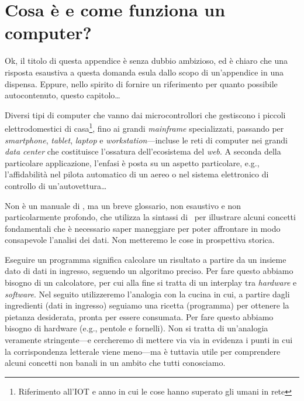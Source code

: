 



\chapter{Cosa \`e e come funziona un computer?}
\label{sec:computazione}

Ok, il titolo di questa appendice \`e senza dubbio ambizioso, ed \`e chiaro che
una risposta esaustiva a questa domanda esula dallo scopo di un'appendice in una
dispensa. Eppure, nello spirito di fornire un riferimento per quanto possibile
autocontenuto, questo capitolo\ldots

Diversi tipi di computer che vanno dai microcontrollori che gestiscono i piccoli
elettrodomestici di casa\footnote{Riferimento all'IOT e anno in cui le cose hanno
superato gli umani in rete}, fino ai grandi \emph{mainframe} specializzati,
passando per \emph{smartphone}, \emph{tablet}, \emph{laptop} e
\emph{workstation}---incluse le reti di computer nei grandi \emph{data center}
che costituisce l'ossatura dell'ecosistema del \emph{web}. A seconda della
particolare applicazione, l'enfasi \`e posta su un aspetto particolare, e.g.,
l'affidabilit\`a nel pilota automatico di un aereo o nel sistema elettronico di
controllo di un'autovettura\ldots

Non \`e un manuale di \python, ma un breve glossario, non esaustivo e non particolarmente
profondo, che utilizza la sintassi di \python\ per illustrare alcuni concetti fondamentali
che \`e necessario saper maneggiare per poter affrontare in modo consapevole
l'analisi dei dati. Non metteremo le cose in prospettiva storica.

Eseguire un programma significa calcolare un risultato a partire da un insieme
dato di dati in ingresso, seguendo un algoritmo preciso. Per fare questo abbiamo
bisogno di un calcolatore, per cui alla fine si tratta di un interplay tra
\emph{hardware} e \emph{software}. Nel seguito utilizzeremo l'analogia con la cucina
in cui, a partire dagli ingredienti (dati in ingresso) seguiamo una ricetta (programma)
per ottenere la pietanza desiderata, pronta per essere consumata. Per fare questo
abbiamo bisogno di hardware (e.g., pentole e fornelli). Non si tratta di un'analogia
veramente stringente---e cercheremo di mettere via via in evidenza i punti in cui
la corrispondenza letterale viene meno---ma \`e tuttavia utile per comprendere
alcuni concetti non banali in un ambito che tutti conosciamo.

